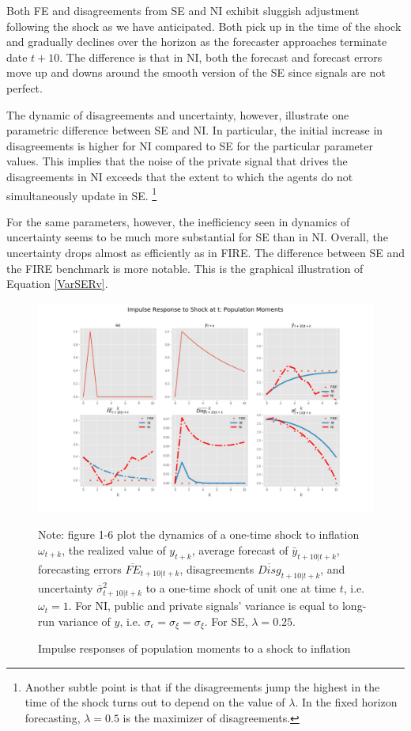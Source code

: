 \documentclass[12pt]{article}
\begin{document}
	
	Both FE and disagreements from SE and NI exhibit sluggish adjustment following the shock as we have anticipated. Both pick up in the time of the shock and gradually declines over the horizon as the forecaster approaches terminate date $t+10$. The difference is that in NI, both the forecast and forecast errors move up and downs around the smooth version of the SE since signals are not perfect. 
	
	The dynamic of disagreements and uncertainty, however,  illustrate one parametric difference between SE and NI. In particular,  the initial increase in disagreements is higher for NI compared to SE for the particular parameter values. This implies that the noise of the private signal that drives the disagreements in NI exceeds that the extent to which the agents do not simultaneously update in SE. \footnote{Another subtle point is that if the disagreements jump the highest in the time of the shock turns out to depend on the value of $\lambda$. In the fixed horizon forecasting, $\lambda=0.5$ is the maximizer of disagreements.}
	
	For the same parameters, however, the inefficiency seen in dynamics of uncertainty seems to be much more substantial for SE than in NI. Overall, the uncertainty drops almost as efficiently as in FIRE. The difference between SE and the FIRE benchmark is more notable. This is the graphical illustration of Equation \ref{VarSERv}. 
	
	
	\begin{figure}[ht]
		\centering
		\includegraphics[width=\textwidth]{figures/ir_popseni.png} 
		\begin{flushleft}
			{\footnotesize Note: figure 1-6 plot the dynamics of a one-time shock to inflation $\omega_{t+k}$, the realized value of $y_{t+k}$,  average forecast of $\bar y_{t+10|t+k}$, forecasting errors $\overline{FE}_{t+10|t+k}$, disagreements $\overline {Disg}_{t+10|t+k}$, and uncertainty $\bar \sigma^2_{t+10|t+k}$ to a one-time shock  of unit one at time $t$, i.e. $\omega_t=1$. For NI, public and private signals’ variance is equal to long-run variance of $y$, i.e. $\sigma_\epsilon = \sigma_\xi = \sigma_\xi $. For SE, $\lambda = 0.25$.  }
		\end{flushleft}
		\caption{Impulse responses of population moments to a shock to inflation}
		\label{ir_pop}
	\end{figure}
	
\end{document}
